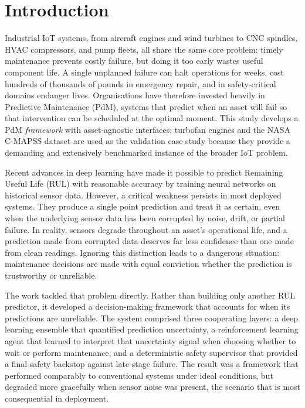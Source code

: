 \documentclass[12pt,a4paper]{report}
\begin{document}
\newpage
{}
\hypersetup{pageanchor=true}
\pagestyle{fancy}
\onehalfspacing
\setlength{\parskip}{0.3cm plus 0.1cm minus 0.05cm}


\chapter{Introduction}

Industrial IoT systems, from aircraft engines and wind turbines to CNC spindles, HVAC compressors, and pump fleets, all share the same core problem: timely maintenance prevents costly failure, but doing it too early wastes useful component life. A single unplanned failure can halt operations for weeks, cost hundreds of thousands of pounds in emergency repair, and in safety-critical domains endanger lives. Organisations have therefore invested heavily in Predictive Maintenance (PdM), systems that predict when an asset will fail so that intervention can be scheduled at the optimal moment. This study develops a PdM \emph{framework} with asset-agnostic interfaces; turbofan engines and the NASA C-MAPSS dataset are used as the validation case study because they provide a demanding and extensively benchmarked instance of the broader IoT problem.


Recent advances in deep learning have made it possible to predict Remaining Useful Life (RUL) with reasonable accuracy by training neural networks on historical sensor data. However, a critical weakness persists in most deployed systems. They produce a single point prediction and treat it as certain, even when the underlying sensor data has been corrupted by noise, drift, or partial failure. In reality, sensors degrade throughout an asset's operational life, and a prediction made from corrupted data deserves far less confidence than one made from clean readings. Ignoring this distinction leads to a dangerous situation: maintenance decisions are made with equal conviction whether the prediction is trustworthy or unreliable.


The work tackled that problem directly. Rather than building only another RUL predictor, it developed a decision-making framework that accounts for when its predictions are unreliable. The system comprised three cooperating layers: a deep learning ensemble that quantified prediction uncertainty, a reinforcement learning agent that learned to interpret that uncertainty signal when choosing whether to wait or perform maintenance, and a deterministic safety supervisor that provided a final safety backstop against late-stage failure. The result was a framework that performed comparably to conventional systems under ideal conditions, but degraded more gracefully when sensor noise was present, the scenario that is most consequential in deployment.
\end{document}
